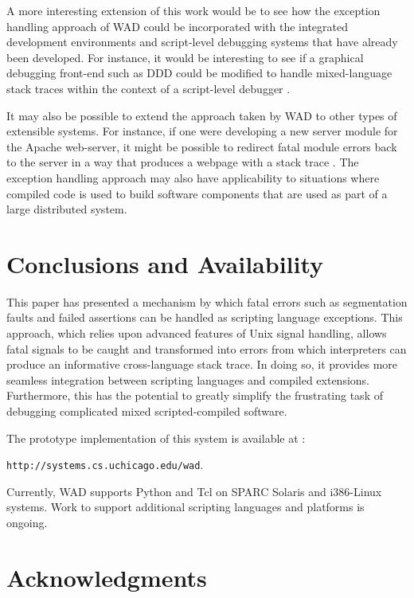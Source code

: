 A more interesting extension of this work would be to see how the
exception handling approach of WAD could be incorporated with
the integrated development environments and script-level debugging
systems that have already been developed.  For instance, it would be interesting
to see if a graphical debugging front-end such as DDD could be modified
to handle mixed-language stack traces within the context of a script-level debugger \cite{ddd}.   

It may also be possible to extend the approach taken by WAD to other
types of extensible systems.  For instance, if one were developing a
new server module for the Apache web-server, it might be possible to redirect fatal
module errors back to the server in a way that produces a webpage with
a stack trace \cite{apache}.  The exception handling approach may also have
applicability to situations where compiled code is used to build software
components that are used as part of a large distributed system.

\section{Conclusions and Availability}

This paper has presented a mechanism by which fatal errors such as
segmentation faults and failed assertions can be handled as scripting
language exceptions.  This approach, which relies upon advanced
features of Unix signal handling, allows fatal signals to be caught
and transformed into errors from which interpreters can produce an
informative cross-language stack trace. In doing so, it provides more
seamless integration between scripting languages and compiled
extensions.  Furthermore, this has the potential to greatly simplify the
frustrating task of debugging complicated mixed scripted-compiled
software.

The prototype implementation of this system is available at :

\begin{center}
{\tt http://systems.cs.uchicago.edu/wad}.
\end{center}

\noindent
Currently, WAD supports Python and Tcl on SPARC Solaris and i386-Linux
systems.  Work to support additional scripting languages and platforms
is ongoing.

\section{Acknowledgments}

